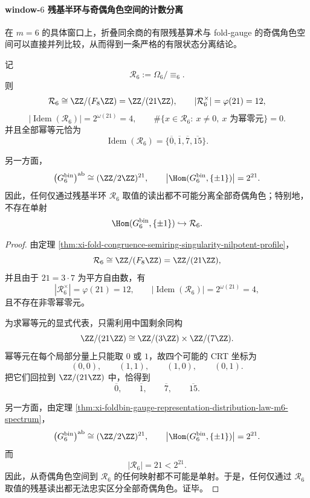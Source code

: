 \paragraph{window-\texorpdfstring{$6$}{6} 残基半环与奇偶角色空间的计数分离}
在 \(m=6\) 的具体窗口上，折叠同余商的有限残基算术与 fold-gauge 的奇偶角色空间可以直接并列比较，从而得到一条严格的有限状态分离结论。

\begin{corollary}\label{cor:xi-window6-residue-semiring-parity-character-gap}
记
\[
\mathcal R_6:=\Omega_6/\!\equiv_6.
\]
则
\[
\mathcal R_6\cong \ZZ/(F_8\ZZ)=\ZZ/(21\ZZ),
\qquad
|\mathcal R_6^\times|=\varphi(21)=12,
\]
\[
|\operatorname{Idem}(\mathcal R_6)|=2^{\omega(21)}=4,
\qquad
\#\{x\in \mathcal R_6:\ x\neq 0,\ x \text{ 为幂零元}\}=0.
\]
并且全部幂等元恰为
\[
\operatorname{Idem}(\mathcal R_6)=\{\overline 0,\overline 1,\overline 7,\overline{15}\}.
\]

另一方面，
\[
\bigl(G_6^{\mathrm{bin}}\bigr)^{\mathrm{ab}}\cong (\ZZ/2\ZZ)^{21},
\qquad
\bigl|\Hom(G_6^{\mathrm{bin}},\{\pm 1\})\bigr|=2^{21}.
\]
因此，任何仅通过残基半环 \(\mathcal R_6\) 取值的读出都不可能分离全部奇偶角色；特别地，不存在单射
\[
\Hom(G_6^{\mathrm{bin}},\{\pm 1\})\hookrightarrow \mathcal R_6.
\]
\end{corollary}
\begin{proof}
由定理 \ref{thm:xi-fold-congruence-semiring-singularity-nilpotent-profile}，
\[
\mathcal R_6\cong \ZZ/(F_8\ZZ)=\ZZ/(21\ZZ),
\]
并且由于 \(21=3\cdot 7\) 为平方自由数，有
\[
|\mathcal R_6^\times|=\varphi(21)=12,
\qquad
|\operatorname{Idem}(\mathcal R_6)|=2^{\omega(21)}=4,
\]
且不存在非零幂零元。

为求幂等元的显式代表，只需利用中国剩余同构
\[
\ZZ/(21\ZZ)\cong \ZZ/(3\ZZ)\times \ZZ/(7\ZZ).
\]
幂等元在每个局部分量上只能取 \(0\) 或 \(1\)，故四个可能的 CRT 坐标为
\[
(0,0),\qquad (1,1),\qquad (1,0),\qquad (0,1).
\]
把它们回拉到 \(\ZZ/(21\ZZ)\) 中，恰得到
\[
\overline 0,\qquad \overline 1,\qquad \overline 7,\qquad \overline{15}.
\]

另一方面，由定理 \ref{thm:xi-foldbin-gauge-representation-distribution-law-m6-spectrum}，
\[
\bigl(G_6^{\mathrm{bin}}\bigr)^{\mathrm{ab}}\cong (\ZZ/2\ZZ)^{21},
\qquad
\bigl|\Hom(G_6^{\mathrm{bin}},\{\pm 1\})\bigr|=2^{21}.
\]
而
\[
|\mathcal R_6|=21<2^{21}.
\]
因此，从奇偶角色空间到 \(\mathcal R_6\) 的任何映射都不可能是单射。于是，任何仅通过 \(\mathcal R_6\) 取值的残基读出都无法忠实区分全部奇偶角色。证毕。
\end{proof}

\endinput
